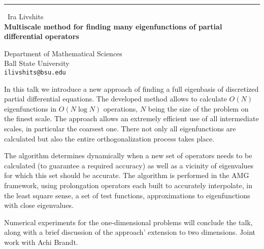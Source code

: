 \documentclass{report}
\begin{document}
\begin{center}
\rule{6in}{1pt} \
{\large Ira Livshits \\
{\bf Multiscale method for finding many eigenfunctions of partial differential operators }}

Department of Mathematical Sciences \\ Ball State University
\\
{\tt ilivshits@bsu.edu}\end{center}

In this talk we introduce a new approach of finding a full eigenbasis of
discretized partial differential equations. The developed method allows
to calculate $O(N)$ eigenfunctions in $O(N\log N)$ operations, $N$ being
the size of the problem on the finest scale. The approach allows an
extremely efficient use of all intermediate scales,
in particular the coarsest one. There not only all eigenfunctions are
calculated but also the entire orthogonalization process takes place.

The algorithm determines dynamically when a new set of operators needs to
be calculated (to guarantee a required accuracy) as well as a vicinity of
eigenvalues for which this set should be accurate. The algorithm is
performed in the AMG framework, using prolongation operators each built
to accurately interpolate, in the least square sense, a set of test
functions, approximations to eigenfunctions with close eigenvalues.

Numerical experiments for the one-dimensional problems will conclude the
talk, along with a brief
discussion of the approach' extension to two dimensions. Joint work with Achi Brandt.
\end{document}
